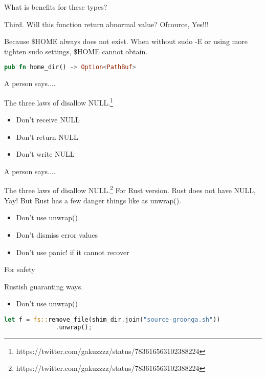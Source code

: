 \documentclass[12pt, unicode]{beamer}
\begin{document}
\begin{frame}[fragile]{What is benefits for these types?}
  \begin{block}{}
    Third. Will this function return abnormal value?
    \newline
    Ofcource, Yes!!!

    Because \$HOME always does not exist.
    \newline
    When without sudo -E or using more tighten sudo settings, \$HOME cannot obtain.
  \end{block}
  \begin{lstlisting}[language={Rust},basicstyle=\ttfamily\Small]
    pub fn home_dir() -> Option<PathBuf>
  \end{lstlisting}
\end{frame}

\begin{frame}[fragile]{A person says....}
  \begin{block}{}
    The three laws of disallow NULL.\footnote[frame]{https://twitter.com/gakuzzzz/status/783616563102388224}
  \end{block}
\begin{itemize}
\item<2-> Don't receive NULL
\item<3-> Don't return NULL
\item<4-> Don't write NULL
\end{itemize}
\end{frame}

\begin{frame}[fragile]{A person says....}
  \begin{block}{}
    The three laws of disallow NULL.\footnote[frame]{https://twitter.com/gakuzzzz/status/783616563102388224}
    \newline
    For Rust version.
    Rust does not have NULL, Yay!
    \newline
    But Rust has a few danger things like as unwrap().
  \end{block}
\begin{itemize}
\item<3-> Don't use unwrap()
\item<4-> Don't dismiss error values
\item<5-> Don't use panic! if it cannot recover
\end{itemize}
\end{frame}

\newcommand\SSmall{\fontsize{7}{7}\selectfont}
\begin{frame}[fragile]{For safety}
  \begin{block}{}
    Rustish guaranting ways.
  \end{block}
\begin{itemize}
\item<2-> Don't use unwrap()
\end{itemize}
  \begin{lstlisting}[language={Rust},basicstyle=\ttfamily\SSmall]
    let f = fs::remove_file(shim_dir.join("source-groonga.sh"))
              .unwrap();
  \end{lstlisting}
\end{frame}
\end{document}
